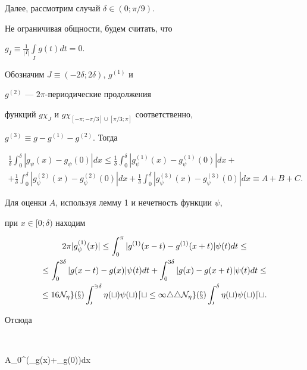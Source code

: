 Далее, рассмотрим случай $\delta\in(0;\pi/9)$.


Не ограничивая общности, будем считать, что


$g_I\equiv\frac{1}{|I|}\int\limits_I g(t)dt=0$.


Обозначим $J\equiv(-2\delta;2\delta)$, $g^{(1)}$ и


$g^{(2)}$ --- $2\pi$-периодические продолжения


функций $g\chi_J$ и $g\chi_{[-\pi;-\pi/3]\cup[\pi/3;\pi]}$ соответственно,


$g^{(3)}\equiv g-g^{(1)}-g^{(2)}$. Тогда


\begin{multline*}


\frac{1}{\delta}\int_0^\delta|g_\psi(x)-g_\psi(0)|dx\le


\frac{1}{\delta}\int_0^\delta|g_\psi^{(1)}(x)-g_\psi^{(1)}(0)|dx+ \\


%


+\frac{1}{\delta}\int_0^\delta|g_\psi^{(2)}(x)-g_\psi^{(2)}(0)|dx


+\frac{1}{\delta}\int_0^\delta|g_\psi^{(3)}(x)-g_\psi^{(3)}(0)|dx\equiv A+B+C.


\end{multline*}





Для оценки $A$, используя лемму 1 и нечетность функции $\psi$,


при $x\in[0;\delta)$ находим


\begin{multline*}


2\pi|g_\psi^{(1)}(x)|\le\int_0^\pi|g^{(1)}(x-t)-g^{(1)}(x+t)|\psi(t)dt\le \\


%


\le\int_0^{3\delta}|g(x-t)-g(x)|\psi(t)dt+


\int_0^{3\delta}|g(x)-g(x+t)|\psi(t)dt\le \\


%


\le 16\N_\eta g(x)\int_0^{3\delta}\eta(t)\psi(t)dt\le


144\N_\eta g(x)\int_0^\delta\eta(t)\psi(t)dt.


\end{multline*}


Отсюда


$$


A\le{}\int_0^\delta(\N_\eta g(x)+\N_\eta g(0))dx



